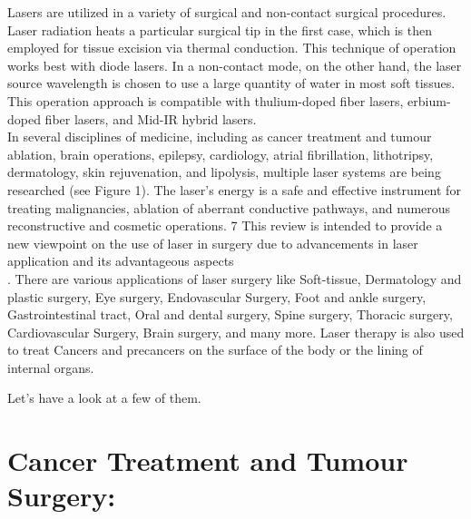 \documentclass[12pt]{article}
\begin{document}
\hspace{2.5cm}Lasers are utilized in a variety of surgical and non-contact surgical procedures. Laser radiation heats a particular surgical tip in the first case, which is then employed for tissue excision via thermal conduction. This technique of operation works best with diode lasers. In a non-contact mode, on the other hand, the laser source wavelength is chosen to use a large quantity of water in most soft tissues. This operation approach is compatible with thulium-doped fiber lasers, erbium-doped fiber lasers, and Mid-IR hybrid lasers.\\
\indent 
\hspace{2cm}In several disciplines of medicine, including as cancer treatment and tumour ablation, brain operations, epilepsy, cardiology, atrial fibrillation, lithotripsy, dermatology, skin rejuvenation, and lipolysis, multiple laser systems are being researched (see Figure 1). The laser's energy is a safe and effective instrument for treating malignancies, ablation of aberrant conductive pathways, and numerous reconstructive and cosmetic operations. 7 This review is intended to provide a new viewpoint on the use of laser in surgery due to advancements in laser application and its advantageous aspects\\.
\indent
\hspace{2.5cm} There are various applications of laser surgery like Soft-tissue, Dermatology and plastic surgery, Eye surgery, Endovascular Surgery, Foot and ankle surgery, Gastrointestinal tract, Oral and dental surgery, Spine surgery, Thoracic surgery, Cardiovascular Surgery, Brain surgery, and many more.  Laser therapy is also used to treat Cancers and precancers on the surface of the body or the lining of internal organs.

\Large{Let’s have a look at a few of them.}

\section{Cancer Treatment and Tumour Surgery:}
\end{document}
